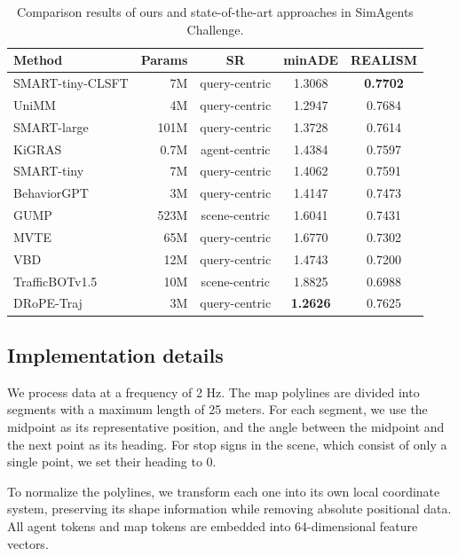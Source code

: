 \documentclass[lettersize,journal]{IEEEtran}
\theoremstyle{definition}
\begin{document}
\begin{table}[h]
\footnotesize
\setlength{\tabcolsep}{3pt}
\caption{Comparison results of ours and state-of-the-art approaches in SimAgents Challenge.}
\centering
\begin{tabular}{@{}lrccc@{}}
\toprule
Method           & Params & SR       & minADE & REALISM \\ \midrule
SMART-tiny-CLSFT & 7M     & query-centric   & 1.3068 & \textbf{0.7702}  \\
UniMM            & 4M     & query-centric   & 1.2947 & 0.7684  \\
SMART-large      & 101M   & query-centric   & 1.3728 & 0.7614  \\
KiGRAS           & 0.7M   & agent-centric   & 1.4384 & 0.7597  \\
SMART-tiny       & 7M     & query-centric   & 1.4062 & 0.7591  \\
BehaviorGPT      & 3M     & query-centric   & 1.4147 & 0.7473  \\
GUMP             & 523M   & scene-centric   & 1.6041 & 0.7431  \\
MVTE             & 65M    & query-centric   & 1.6770 & 0.7302  \\
VBD              & 12M    & query-centric   & 1.4743 & 0.7200  \\
TrafficBOTv1.5   & 10M    & scene-centric   & 1.8825 & 0.6988  \\
DRoPE-Traj             & 3M     & query-centric   & \textbf{1.2626} & 0.7625  \\ \bottomrule
\end{tabular}
\label{tab:cmp}
\end{table}

\subsection{Implementation details}
We process data at a frequency of 2 Hz. The map polylines are divided into segments with a maximum length of 25 meters. For each segment, we use the midpoint as its representative position, and the angle between the midpoint and the next point as its heading. For stop signs in the scene, which consist of only a single point, we set their heading to 0. 

To normalize the polylines, we transform each one into its own local coordinate system, preserving its shape information while removing absolute positional data.
All agent tokens and map tokens are embedded into 64-dimensional feature vectors.
\end{document}
